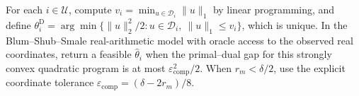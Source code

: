 For each \(i\in\mathcal U\), compute \(v_i=\min_{u\in\mathcal D_i}\lVert u\rVert_1\) by linear programming, and define \(\theta_i^{\mathrm D}=\arg\min\{\lVert u\rVert_2^2/2:u\in\mathcal D_i,\ \lVert u\rVert_1\le v_i\}\), which is unique. In the Blum--Shub--Smale real-arithmetic model with oracle access to the observed real coordinates, return a feasible \(\widehat\theta_i\) when the primal--dual gap for this strongly convex quadratic program is at most \(\varepsilon_{\mathrm{comp}}^2/2\). When \(r_m<\delta/2\), use the explicit coordinate tolerance \(\varepsilon_{\mathrm{comp}}=(\delta-2r_m)/8\).